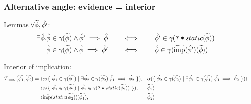\documentclass[11pt,a4paper]{article}
\begin{document}

\subsubsection{Alternative angle: evidence = interior}
Lemmas $\forall \widetilde{\phi}, \hat{\phi'}$:
\begin{align*}
\exists \hat{\phi}. 
&\hat{\phi} \in \gamma(\widetilde{\phi}) \wedge \hat{\phi'} \implies \hat{\phi}
\quad\quad
\iff
\quad\quad
\hat{\phi'} \in \gamma(\texttt{\texttt{?}\:*\:$static(\widetilde{\phi})$})\\
&\hat{\phi} \in \gamma(\widetilde{\phi}) \wedge \hat{\phi} \implies \hat{\phi'}
\quad\quad
\iff
\quad\quad
\hat{\phi} \in \gamma(\widetilde{\textrm{imp}}(\hat{\phi'})(\widetilde{\phi}))\\
\end{align*}


Interior of implication:
\begin{align*}
\mathcal{I}_{\implies}(\widetilde{\phi_1}, \widetilde{\phi_2})
= \langle 
    &\alpha(\{~ \hat{\phi_1} \in \gamma(\widetilde{\phi_1}) ~|~ \exists \hat{\phi_2} \in \gamma(\widetilde{\phi_2}). \hat{\phi_1} \implies \hat{\phi_2} ~\}),
    &&\alpha(\{~ \hat{\phi_2} \in \gamma(\widetilde{\phi_2}) ~|~ \exists \hat{\phi_1} \in \gamma(\widetilde{\phi_1}). \hat{\phi_1} \implies \hat{\phi_2} ~\}) 
\rangle\\
= \langle 
    &\alpha(\{~ \hat{\phi_1} \in \gamma(\widetilde{\phi_1}) ~|~ \hat{\phi_1} \in \gamma(\texttt{\texttt{?}\:*\:$static(\widetilde{\phi_2})$}) ~\}),
    &&\widetilde{\phi_2} 
\rangle\\
= \langle 
    &\widetilde{\textrm{imp}}(static(\widetilde{\phi_2}))(\widetilde{\phi_1}),
    &&\widetilde{\phi_2} 
\rangle\\
\end{align*}
\end{document}
